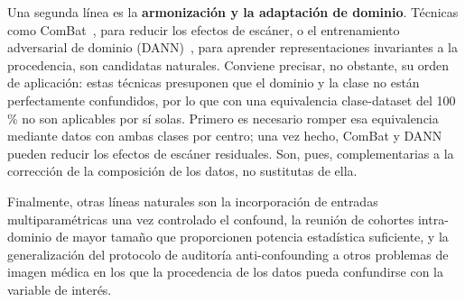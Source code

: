 Una segunda línea es la \textbf{armonización y la adaptación de dominio}. Técnicas
como ComBat~\cite{johnson2007combat,fortin2017harmonization}, para reducir los
efectos de escáner, o el entrenamiento adversarial de dominio
(DANN)~\cite{ganin2016dann}, para aprender representaciones invariantes a la
procedencia, son candidatas naturales. Conviene precisar, no obstante, su orden de
aplicación: estas técnicas presuponen que el dominio y la clase no están
perfectamente confundidos, por lo que con una equivalencia clase-dataset del
100\,\% no son aplicables por sí solas. Primero es necesario romper esa
equivalencia mediante datos con ambas clases por centro; una vez hecho, ComBat y
DANN pueden reducir los efectos de escáner residuales. Son, pues, complementarias
a la corrección de la composición de los datos, no sustitutas de ella.

Finalmente, otras líneas naturales son la incorporación de entradas
multiparamétricas una vez controlado el confound, la reunión de cohortes
intra-dominio de mayor tamaño que proporcionen potencia estadística suficiente, y
la generalización del protocolo de auditoría anti-confounding a otros problemas de
imagen médica en los que la procedencia de los datos pueda confundirse con la
variable de interés.
